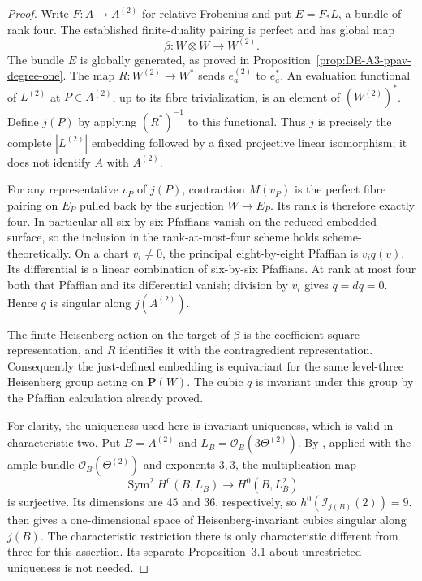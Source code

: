 \begin{proof}
Write $F:A\to A^{(2)}$ for relative Frobenius and put
$E=F_*L$, a bundle of rank four. The established finite-duality
pairing is perfect and has global map
\[
 \beta:W\otimes W\longrightarrow W^{(2)}.
\]
The bundle $E$ is globally generated, as proved in
Proposition~\ref{prop:DE-A3-ppav-degree-one}. The map
$R:W^{(2)}\to W^*$ sends $e_a^{(2)}$ to $e_a^*$.
An evaluation functional of $L^{(2)}$ at $P\in A^{(2)}$, up to
its fibre trivialization, is an element of $(W^{(2)})^*$.
Define $j(P)$ by applying $(R^*)^{-1}$ to this functional.
Thus $j$ is precisely the complete $|L^{(2)}|$ embedding followed
by a fixed projective linear isomorphism; it does not identify
$A$ with $A^{(2)}$.

For any representative $v_P$ of $j(P)$, contraction $M(v_P)$ is
the perfect fibre pairing on $E_P$ pulled back by the surjection
$W\to E_P$. Its rank is therefore exactly four. In particular all
six-by-six Pfaffians vanish on the reduced embedded surface, so
the inclusion in the rank-at-most-four scheme holds scheme-theoretically.
On a chart $v_i\ne0$, the principal eight-by-eight Pfaffian is
$v_iq(v)$. Its differential is a linear combination of six-by-six
Pfaffians. At rank at most four both that Pfaffian and its
differential vanish; division by $v_i$ gives $q=dq=0$.
Hence $q$ is singular along $j(A^{(2)})$.

The finite Heisenberg action on the target of $\beta$ is the
coefficient-square representation, and $R$ identifies it with the
contragredient representation. Consequently the just-defined
embedding is equivariant for the same level-three Heisenberg group
acting on $\mathbf P(W)$. The cubic $q$ is invariant under this
group by the Pfaffian calculation already proved.

For clarity, the uniqueness used here is invariant uniqueness,
which is valid in characteristic two. Put $B=A^{(2)}$ and
$L_B=\mathcal O_B(3\Theta^{(2)})$. By
\citet[Theorem~2.4, p.~723]{Sekiguchi1977PNII}, applied with
the ample bundle $\mathcal O_B(\Theta^{(2)})$ and exponents $3,3$,
the multiplication map
\[
 \operatorname{Sym}^2H^0(B,L_B)\longrightarrow H^0(B,L_B^2)
\]
is surjective. Its dimensions are $45$ and $36$, respectively,
so $h^0(\mathcal I_{j(B)}(2))=9$.
\citet[Proposition~2.1, Remark~(3), Corollary~2.2, pp.~191--192]
{Beauville2003Coble} then gives a one-dimensional space of
Heisenberg-invariant cubics singular along $j(B)$.
The characteristic restriction there is only characteristic
different from three for this assertion. Its separate
Proposition~3.1 about unrestricted uniqueness is not needed.


\end{proof}
